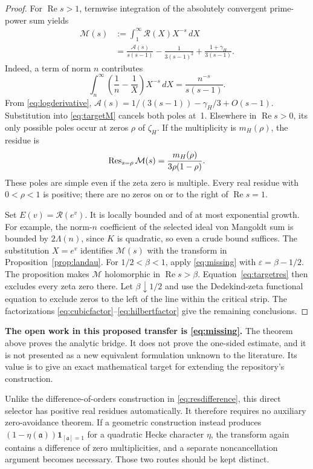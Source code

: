 \documentclass[11pt,letterpaper]{article}
\theoremstyle{definition}\newtheorem{definition}[theorem]{Definition}
\theoremstyle{remark}\newtheorem{remark}[theorem]{Remark}
\newcommand{\re}{\operatorname{Re}}\newcommand{\im}{\operatorname{Im}}
\newcommand{\one}{\mathbf 1}\newcommand{\code}[1]{\texttt{\small #1}}
\newcommand{\keybox}[1]{\par\smallskip\noindent\colorbox{pale}{\parbox{\dimexpr\linewidth-2\fboxsep}{#1}}\par\smallskip}
\begin{document}
\begin{proof}
For $\re s>1$, termwise integration of the absolutely convergent prime-power sum yields
\begin{align}
 \mathcal M(s)
 &:=\int_1^\infty\mathcal R(X)X^{-s}\,dX\\
 &=\frac{\mathcal A(s)}{s(s-1)}
   -\frac1{3(s-1)^2}+\frac{1+\gamma_H}{3(s-1)}.\label{eq:targetM}
\end{align}
Indeed, a term of norm $n$ contributes
\[
 \int_n^\infty\left(\frac1n-\frac1X\right)X^{-s}\,dX
 =\frac{n^{-s}}{s(s-1)}.
\]
From \eqref{eq:logderivative},
$\mathcal A(s)=1/(3(s-1))-\gamma_H/3+O(s-1)$.
Substitution into \eqref{eq:targetM} cancels both poles at~1.
Elsewhere in $\re s>0$, its only possible poles occur at zeros $\rho$ of $\zeta_H$.
If the multiplicity is $m_H(\rho)$, the residue is
\begin{equation}\label{eq:targetres}
 \operatorname{Res}_{s=\rho}\mathcal M(s)
 =\frac{m_H(\rho)}{3\rho(1-\rho)}.
\end{equation}
These poles are simple even if the zeta zero is multiple. Every real residue with
$0<\rho<1$ is positive; there are no zeros on or to the right of $\re s=1$.

Set $E(v)=\mathcal R(e^v)$. It is locally bounded and of at most exponential growth.
For example, the norm-$n$ coefficient of the selected ideal von Mangoldt sum is bounded
by $2\Lambda(n)$, since $K$ is quadratic, so even a crude bound suffices.
The substitution $X=e^v$ identifies $\mathcal M(s)$ with the transform in
Proposition~\ref{prop:landau}. For $1/2<\beta<1$, apply \eqref{eq:missing} with
$\varepsilon=\beta-1/2$. The proposition makes $\mathcal M$ holomorphic in $\re s>\beta$.
Equation~\eqref{eq:targetres} then excludes every zeta zero there.
Let $\beta\downarrow1/2$ and use the Dedekind-zeta functional equation to exclude zeros
to the left of the line within the critical strip. The factorizations
\eqref{eq:cubicfactor}--\eqref{eq:hilbertfactor} give the remaining conclusions.
\end{proof}

\keybox{\textbf{The open work in this proposed transfer is \eqref{eq:missing}.}
The theorem above proves the analytic bridge. It does not prove the one-sided estimate,
and it is not presented as a new equivalent formulation unknown to the literature.
Its value is to give an exact mathematical target for extending the repository's construction.}

Unlike the difference-of-orders construction in \eqref{eq:resdifference}, this direct selector
has positive real residues automatically. It therefore requires no auxiliary zero-avoidance
theorem. If a geometric construction instead produces
$(1-\eta(\mathfrak a))\one_{[\mathfrak a]=1}$ for a quadratic Hecke character $\eta$,
the transform again contains a difference of zero multiplicities, and a separate
noncancellation argument becomes necessary. Those two routes should be kept distinct.
\end{document}
